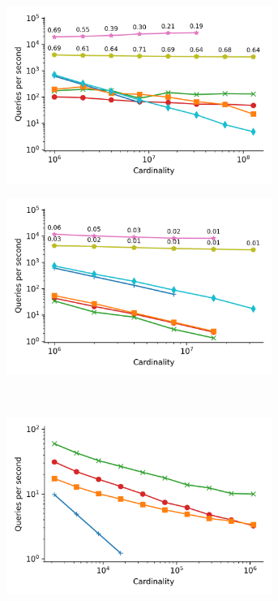 \begin{figure}
\begin{subfigure}[b]{0.5\textwidth}
        \includegraphics[width=0.95\textwidth]{plots/sift_PermutedBall_10_throughput.png}
        \label{fig:results:sift-scaling}
    \end{subfigure}%
    \begin{subfigure}[b]{0.5\textwidth}
        \includegraphics[width=0.95\textwidth]{plots/random_PermutedBall_10_throughput.png}
        \label{fig:results:random-scaling}
    \end{subfigure}%
    \\
    \begin{subfigure}[b]{0.5\textwidth}
        \includegraphics[width=0.95\textwidth]{plots/silva-SSU-Ref_PermutedBall_10_throughput.png}

\end{subfigure}
\end{figure}
